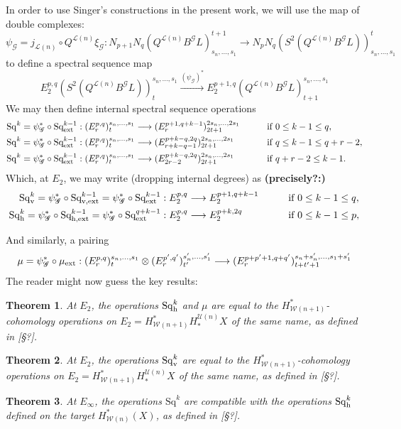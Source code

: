 \documentclass[11pt]{amsart}
\theoremstyle{plain}
\newtheorem{thm}{Theorem}[section]
\theoremstyle{definition}
\renewcommand{\to}{\longrightarrow}
\newcommand{\scrG}{\mathscr{G}}
\newcommand{\calW}{\mathcal{W}}
\newcommand{\calU}{\mathcal{U}}
\newcommand{\calL}{\mathcal{L}}
\theoremstyle{plain}
\newcommand{\BSW}{{\scrG}}
\newcommand{\BSWres}{B^\BSW}%
\newcommand{\ExtCohOp}{\textup{Sq}_\textup{ext}}
\newcommand{\vExtCohOp}{\textup{Sq}_\textup{v,ext}}
\newcommand{\hExtCohOp}{\textup{Sq}_\textup{h,ext}}
\newcommand{\ExtCohProd}{\mu_\textup{ext}}
\newcommand{\Sq}{\mathrm{Sq}}
\newcommand{\Sqh}{\mathrm{Sq}_\textup{h}}
\newcommand{\Sqv}{\mathrm{Sq}_\textup{v}}
\begin{document}
\begin{Operations in composite functor spectral sequences}
In order to use Singer's constructions in the present work, we will use the map of double complexes:
\[\psi_{\BSW}=j_{\calL(n)}\circ Q^{\calL(n)}\xi_\BSW:N_{p+1}N_q(Q^{\calL(n)}\BSWres L)_{s_n,\ldots,s_1}^{t+1}\to N_{p}N_q(S^2(Q^{\calL(n)}\BSWres L))_{s_n,\ldots,s_1}^{t}\]
to define a spectral sequence map
\[E_2^{p,q}(S^2(Q^{\calL(n)}\BSWres L))^{s_n,\ldots,s_1}_t\overset{(\psi_\BSW)^*}{\to} E_2^{p+1,q}(Q^{\calL(n)}\BSWres L)^{s_n,\ldots,s_1}_{t+1}\]
We may then define internal spectral sequence operations
\begin{alignat*}{2}
\Sq^k=\psi_{\BSW}^*\circ\ExtCohOp^{k-1}:(E^{p,q}_r)^{s_n,\ldots,s_1}_t&\to (E^{p+1,q+k-1}_r)^{2s_n,\ldots,2s_1}_{2t+1}&\qquad&\text{if }0\leq k-1 \leq q,\\
\Sq^k=\psi_{\BSW}^*\circ\ExtCohOp^{k-1}:(E^{p,q}_r)^{s_n,\ldots,s_1}_t&\to (E^{p+k-q,2q}_{r+k-q-1})^{2s_n,\ldots,2s_1}_{2t+1}&\qquad&\text{if }q\leq k-1\leq q+r-2,\\
\Sq^k=\psi_{\BSW}^*\circ\ExtCohOp^{k-1}:(E^{p,q}_r)^{s_n,\ldots,s_1}_t&\to (E^{p+k-q,2q}_{2r-2})^{2s_n,\ldots,2s_1}_{2t+1}&\qquad&\text{if }q+r-2\leq k-1.
\end{alignat*}
Which, at $E_2$, we may write (dropping internal degrees) as \textbf{(precisely?:)}
\begin{alignat*}{2}
\Sqv^k=\psi_{\BSW}^*\circ\vExtCohOp^{k-1}= \psi_{\BSW}^*\circ\ExtCohOp^{k-1}:E^{p,q}_2&\to E^{p+1,q+k-1}_2&\qquad&\text{if }0\leq k-1 \leq q,\\
\Sqh^k=\psi_{\BSW}^*\circ\hExtCohOp^{k-1}= \psi_{\BSW}^*\circ\ExtCohOp^{q+k-1}:E^{p,q}_2&\to E^{p+k,2q}_2&\qquad&\text{if }0\leq k-1 \leq p,
\end{alignat*}

And similarly, a pairing
\[\mu=\psi_{\BSW}^*\circ\ExtCohProd:(E^{p,q}_r)^{s_n,\ldots,s_1}_t\otimes (E^{p',q'}_r)^{s'_n,\ldots,s'_1}_{t'}\to (E^{p+p'+1,q+q'}_r)^{s_n+s'_n,\ldots,s_1+s'_1}_{t+t'+1}\]
The reader might now guess the key results:
\begin{thm}\label{E2CompFuncLieOperationsID}
At $E_2$, the operations $\Sqh^k$ and $\mu$ are equal to the $H^*_{\calW(n+1)}$-cohomology operations on $E_2=H^*_{\calW(n+1)}H_*^{\calU(n)}X$ of the same name, as defined in [\S?].
\end{thm}
\begin{thm}\label{E2CompFuncKosOperationsID}
At $E_2$, the operations $\Sqv^k$ are equal to the $H^*_{\calW(n+1)}$-cohomology operations on $E_2=H^*_{\calW(n+1)}H_*^{\calU(n)}X$ of the same name, as defined in [\S?].
\end{thm}
\begin{thm}\label{EInftyCompFuncOperationsID}
At $E_\infty$, the operations $\Sq^k$ are compatible with the operations $\Sqh^k$ defined on the target $H^*_{\calW(n)}(X)$, as defined in [\S?].
\end{thm} 

\end{Operations in composite functor spectral sequences}
\end{document}
